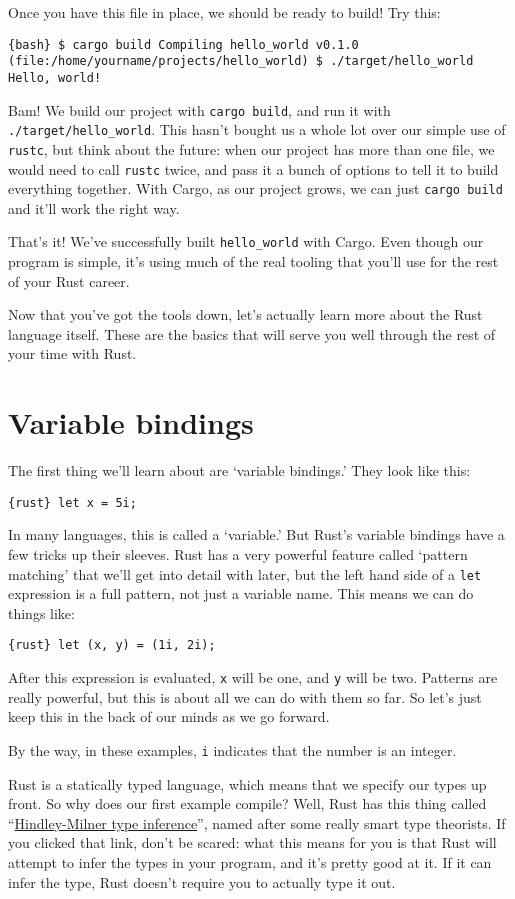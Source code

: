 \documentclass[]{article}
\begin{document}
Once you have this file in place, we should be ready to build! Try this:

\texttt{\{bash\} \$ cargo build    Compiling hello\_world v0.1.0 (file:/home/yourname/projects/hello\_world) \$ ./target/hello\_world Hello, world!}

Bam! We build our project with \texttt{cargo build}, and run it with
\texttt{./target/hello\_world}. This hasn't bought us a whole lot over
our simple use of \texttt{rustc}, but think about the future: when our
project has more than one file, we would need to call \texttt{rustc}
twice, and pass it a bunch of options to tell it to build everything
together. With Cargo, as our project grows, we can just
\texttt{cargo build} and it'll work the right way.

That's it! We've successfully built \texttt{hello\_world} with Cargo.
Even though our program is simple, it's using much of the real tooling
that you'll use for the rest of your Rust career.

Now that you've got the tools down, let's actually learn more about the
Rust language itself. These are the basics that will serve you well
through the rest of your time with Rust.

\section{Variable bindings}\label{variable-bindings}

The first thing we'll learn about are `variable bindings.' They look
like this:

\texttt{\{rust\} let x = 5i;}

In many languages, this is called a `variable.' But Rust's variable
bindings have a few tricks up their sleeves. Rust has a very powerful
feature called `pattern matching' that we'll get into detail with later,
but the left hand side of a \texttt{let} expression is a full pattern,
not just a variable name. This means we can do things like:

\texttt{\{rust\} let (x, y) = (1i, 2i);}

After this expression is evaluated, \texttt{x} will be one, and
\texttt{y} will be two. Patterns are really powerful, but this is about
all we can do with them so far. So let's just keep this in the back of
our minds as we go forward.

By the way, in these examples, \texttt{i} indicates that the number is
an integer.

Rust is a statically typed language, which means that we specify our
types up front. So why does our first example compile? Well, Rust has
this thing called
``\href{http://en.wikipedia.org/wiki/Hindley\%E2\%80\%93Milner_type_system}{Hindley-Milner
type inference}'', named after some really smart type theorists. If you
clicked that link, don't be scared: what this means for you is that Rust
will attempt to infer the types in your program, and it's pretty good at
it. If it can infer the type, Rust doesn't require you to actually type
it out.
\end{document}
